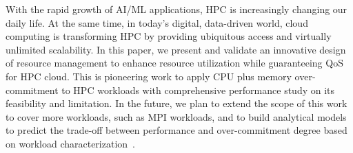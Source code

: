 With the rapid growth of AI/ML applications, HPC is increasingly changing our daily life. 
At the same time, in today's digital, data-driven world, cloud computing is transforming
HPC by providing ubiquitous access and virtually unlimited scalability. In this paper, 
we present and validate an innovative design of resource management to enhance resource 
utilization while guaranteeing QoS for HPC cloud. This is pioneering work to apply CPU plus memory 
over-commitment to HPC workloads with comprehensive performance study on its feasibility and limitation. In the future, 
we plan to extend the scope of this work to cover more workloads, such as MPI workloads, and to build 
analytical models to predict the trade-off between performance and over-commitment degree based on 
workload characterization~\cite{arlitt1997internet,234855}. 